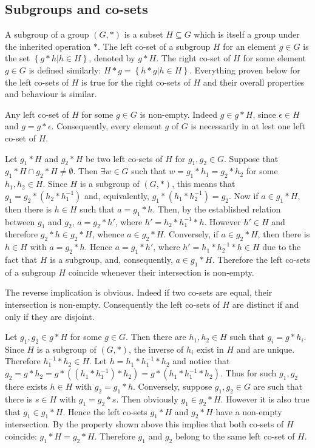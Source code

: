 \documentclass[a4paper]{article}
\newcommand{\obj}[1]{\left\{{#1}\right\}}
\newcommand{\brac}[1]{{\left({#1}\right)}}
\begin{document}
\subsection{Subgroups and co-sets} %
\label{sub:subgroups_and_co_sets}
A subgroup of a group $\brac{G, \ast}$ is a subset $H\subseteq G$ which is itself a group under the inherited operation $\ast$. The left co-set of a subgroup $H$ for an element $g\in G$ is the set $\obj{g\ast h\vert h\in H}$, denoted by $g\ast H$. The right co-set of $H$ for some element $g\in G$ is defined similarly: $H\ast g = \obj{h\ast g\vert h\in H}$. Everything proven below for the left co-sets of $H$ is true for the right co-sets of $H$ and their overall properties and behaviour is similar.

Any left co-set of $H$ for some $g\in G$ is non-empty. Indeed $g\in g\ast H$, since $\epsilon\in H$ and $g=g\ast \epsilon$. Consequently, every element $g$ of $G$ is necessarily in at lest one left co-set of $H$.

Let $g_1\ast H$ and $g_2\ast H$ be two left co-sets of $H$ for $g_1,g_2\in G$. Suppose that $g_1\ast H \cap g_2\ast H\neq \emptyset$. Then $\exists{w\in G}$ such that $w=g_1\ast h_1=g_2\ast h_2$ for some $h_1,h_2\in H$. Since $H$ is a subgroup of $\brac{G, \ast}$, this means that $g_1=g_2\ast (h_2\ast h_1^{-1})$ and, equivalently, $g_1\ast (h_1\ast h_2^{-1})=g_2$.
Now if $a\in g_1\ast H$, then there is $h\in H$ such that $a=g_1\ast h$. Then, by the established relation between $g_1$ and $g_2$, $a=g_2\ast h'$, where $h'=h_2\ast h_1^{-1}\ast h$. However $h'\in H$ and therefore $g_2\ast h\in g_2\ast H$, whence $a\in g_2\ast H$. Conversely, if $a\in g_2\ast H$, then there is $h\in H$ with $a=g_2\ast h$. Hence $a=g_1\ast h'$, where $h'=h_1\ast h_2^{-1}\ast h\in H$ due to the fact that $H$ is a subgroup, and, consequently, $a\in g_1\ast H$. Therefore the left co-sets of a subgroup $H$ coincide whenever their intersection is non-empty.

The reverse implication is obvious. Indeed if two co-sets are equal, their intersection is non-empty. Consequently the left co-sets of $H$ are distinct if and only if they are disjoint.

Let $g_1, g_2\in g\ast H$ for some $g\in G$. Then there are $h_1, h_2\in H$ such that $g_i=g\ast h_i$. Since $H$ is a subgroup of $\brac{G, \ast}$, the inverse of $h_i$ exist in $H$ and are unique. Therefore $h_1^{-1}\ast h_2\in H$. Let $h = h_1\ast h_1^{-1}\ast h_2$ and notice that $g_2 = g\ast h_2 = g\ast\brac{(h_1\ast h_1^{-1})\ast h_2} = g\ast \brac{h_1\ast h_1^{-1}\ast h_2}$. Thus for such $g_1, g_2$ there exists $h\in H$ with $g_2=g_1\ast h$.
Conversely, suppose $g_1, g_2\in G$ are such that there is $s\in H$ with $g_1=g_2\ast s$. Then obviously $g_1\in g_2\ast H$. However it is also true that $g_1\in g_1\ast H$. Hence the left co-sets $g_1\ast H$ and $g_2\ast H$ have a non-empty intersection. By the property shown above this implies that both co-sets of $H$ coincide: $g_1\ast H = g_2\ast H$. Therefore $g_1$ and $g_2$ belong to the same left co-set of $H$.
\end{document}
